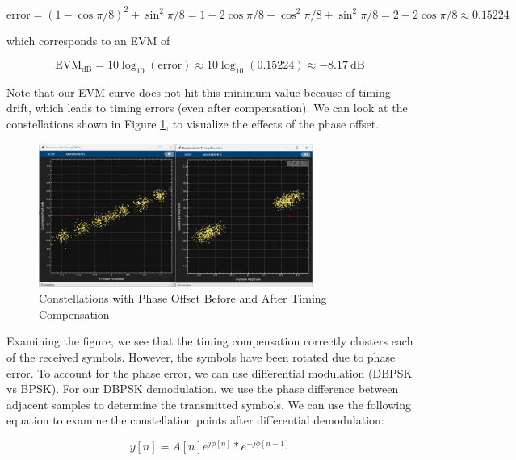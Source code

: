 \documentclass{article}
\begin{document}
\begin{equation}
	\text{error} = (1 - \cos\pi/8)^2 + \sin^2\pi/8 = 1 - 2\cos\pi/8 + \cos^2\pi/8 + \sin^2\pi/8 = 2 - 2\cos\pi/8 \approx 0.15224 
\end{equation}

\noindent which corresponds to an EVM of 

\begin{equation}
	\text{EVM}_{\text{dB}} = 10\log_{10}\left(\text{error}\right) \approx 10\log_{10}(0.15224) \approx -8.17\ \text{dB}
\end{equation}

\noindent Note that our EVM curve does not hit this minimum value because of timing drift, which leads to timing errors (even after compensation). We can look at the constellations shown in Figure \ref{fig::constellations_with_timing_correction_phase_offset}, to visualize the effects of the phase offset.

\begin{figure}[H]
	\centerline{\includegraphics[width=0.8\textwidth]{constellations_with_timing_correction_phase_offset.png}}
	\caption{Constellations with Phase Offset Before and After Timing Compensation}
	\label{fig::constellations_with_timing_correction_phase_offset}
\end{figure}

\noindent Examining the figure, we see that the timing compensation correctly clusters each of the received symbols. However, the symbols have been rotated due to phase error. To account for the phase error, we can use differential modulation (DBPSK vs BPSK). For our DBPSK demodulation, we use the phase difference between adjacent samples to determine the transmitted symbols. We can use the following equation to examine the constellation points after differential demodulation:

\begin{equation}
	y[n] = A[n]e^{j\phi[n]}*e^{-j\phi[n-1]}
	\label{eq::dbpsk}
\end{equation}
\end{document}
